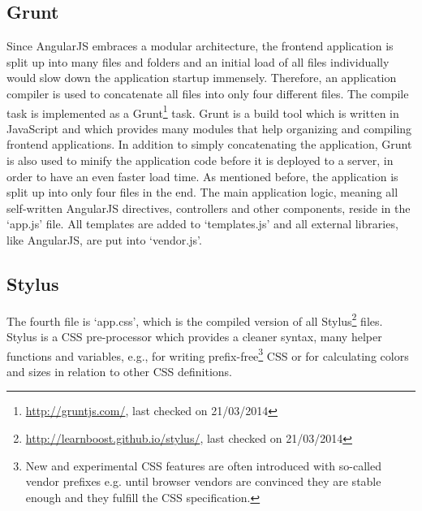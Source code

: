 \subsection{Grunt}
\label{subsec:technology-grunt}
Since AngularJS embraces a modular architecture, the frontend application is split up into many files and folders and an initial load of all files individually would slow down the application startup immensely. Therefore, an application compiler is used to concatenate all files into only four different files. The compile task is implemented as a Grunt\footnote{\url{http://gruntjs.com/}, last checked on 21/03/2014} task. Grunt is a build tool which is written in JavaScript and which provides many modules that help organizing and compiling frontend applications. In addition to simply concatenating the application, Grunt is also used to minify the application code before it is deployed to a server, in order to have an even faster load time. As mentioned before, the application is split up into only four files in the end. The main application logic, meaning all self-written AngularJS directives, controllers and other components, reside in the `app.js' file. All templates are added to `templates.js' and all external libraries, like AngularJS, are put into `vendor.js'.

\subsection{Stylus}
\label{subsec:technology-stylus}
The fourth file is `app.css', which is the compiled version of all Stylus\footnote{\url{http://learnboost.github.io/stylus/}, last checked on 21/03/2014} files. Stylus is a CSS pre-processor which provides a cleaner syntax, many helper functions and variables, e.g., for writing prefix-free\footnote{New and experimental CSS features are often introduced with so-called vendor prefixes e.g.  until browser vendors are convinced they are stable enough and they fulfill the CSS specification.} CSS or for calculating colors and sizes in relation to other CSS definitions.